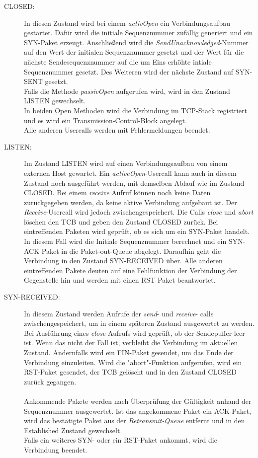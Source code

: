 \begin{description}
\item[CLOSED:]
In diesen Zustand wird bei einem \textit{activOpen} ein Verbindungsaufbau gestartet. Dafür wird die initiale Sequenznummer zufällig generiert und ein SYN-Paket erzeugt. Anschließend wird die \textit{SendUnacknowledged}-Nummer auf den Wert der initialen Sequenznummer gesetzt und der Wert für die nächste Sendesequenznummer auf die um Eins erhöhte intiale Sequenznummer gesetzt. Des Weiteren wird der nächste Zustand auf SYN-SENT gesetzt. \\
Falls die Methode \textit{passivOpen} aufgerufen wird, wird in den Zustand LISTEN gewechselt. \\
In beiden Open Methoden wird die Verbindung im TCP-Stack registriert und es wird ein Transmission-Control-Block angelegt.\\
Alle anderen Usercalls werden mit Fehlermeldungen beendet. 

\item[LISTEN:]
Im Zustand LISTEN wird auf einen Verbindungsaufbau von einem externen Host gewartet. Ein \textit{activeOpen}-Usercall kann auch in diesem Zustand noch ausgeführt werden, mit demselben Ablauf wie im Zustand CLOSED. Bei einem \textit{receive} Aufruf können noch keine Daten zurückgegeben werden, da keine aktive Verbindung aufgebaut ist. Der \textit{Receive}-Usercall wird jedoch zwischengespeichert. 
Die Calls \textit{close} und \textit{abort} löschen den TCB und geben den Zustand CLOSED zurück.
Bei eintreffenden Paketen wird geprüft, ob es sich um ein SYN-Paket handelt. In diesem Fall wird die Initiale Sequenznummer berechnet und ein SYN-ACK Paket in die Paket-out-Queue abgelegt. Daraufhin geht die Verbindung in den Zustand SYN-RECEIVED über. Alle anderen eintreffenden Pakete deuten auf eine Fehlfunktion der Verbindung der Gegenstelle hin und werden mit einen RST Paket beantwortet. 


\item[SYN-RECEIVED:]
In diesem Zustand werden Aufrufe der \textit{send}- und \textit{receive}- calls zwischengespeichert, um in einem späteren Zustand ausgewertet zu werden. 
Bei Ausführung eines \textit{close}-Aufrufs wird geprüft, ob der Sendepuffer leer ist. Wenn das nicht der Fall ist, verbleibt die Verbindung im aktuellen Zustand. Andernfalls wird ein FIN-Paket gesendet, um das Ende der Verbindung einzuleiten. 
Wird die "{}abort"{}-Funktion aufgerufen, wird ein RST-Paket gesendet, der TCB gelöscht und in den Zustand CLOSED zurück gegangen.\\\\
Ankommende Pakete werden nach Überprüfung der Gültigkeit anhand der Sequenznummer ausgewertet. Ist das angekommene Paket ein ACK-Paket, wird das bestätigte Paket aus der \textit{Retransmit-Queue} entfernt und in den Established Zustand gewechselt. \\ Falls ein weiteres SYN- oder ein RST-Paket ankommt, wird die Verbindung beendet. 


\end{description}
